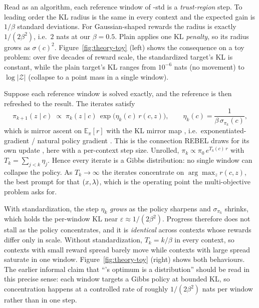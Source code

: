 Read as an algorithm, each reference window of \rrebel{}-std is a
\emph{trust-region} step. To leading order the KL radius is the same in every
context and the expected gain is $1/\beta$ standard deviations. For
Gaussian-shaped rewards the radius is exactly $1/(2\beta^2)$, i.e.\ $2$ nats at
our $\beta = 0.5$. Plain \rrebel{} applies one KL \emph{penalty}, so its radius
grows as $\sigma(c)^2$. Figure~\ref{fig:theory-toy} (left) shows the
consequence on a toy problem: over five decades of reward scale, the
standardized target's KL is constant, while the plain target's KL ranges from
$10^{-6}$ nats (no movement) to $\log|\mathcal{Z}|$ (collapse to a point mass
in a single window).

\begin{proposition}
\label{prop:mirror}
Suppose each reference window is solved exactly, and the reference is then
refreshed to the result. The iterates satisfy
\begin{equation}
  \pi_{k+1}(z\mid c) \;\propto\; \pi_k(z\mid c)\,
  \exp\bigl(\eta_k(c)\, r(c,z)\bigr),
  \qquad \eta_k(c) = \frac{1}{\beta\,\sigma_{\pi_k}(c)},
  \label{eq:th-mirror}
\end{equation}
which is mirror ascent on $\mathbb{E}_\pi[r]$ with the KL mirror map
\citep{beck2003mirror}, i.e.\ exponentiated-gradient / natural policy gradient
\citep{kakade2001npg}. This is the connection REBEL draws for its own update
\citep{gao2024rebel}, here with a per-context step size. Unrolled,
$\pi_k \propto \pi_0\, e^{T_k(c)\, r}$ with $T_k = \sum_{j<k}\eta_j$. Hence every
iterate is a Gibbs distribution: no single window can collapse the policy. As
$T_k \to \infty$ the iterates concentrate on $\arg\max_z r(c,z)$, the best
prompt for that $(x,\lambda)$, which is the operating point the multi-objective
problem asks for.
\end{proposition}

With standardization, the step $\eta_k$ \emph{grows} as the policy sharpens and
$\sigma_{\pi_k}$ shrinks, which holds the per-window KL near
$\varepsilon \approx 1/(2\beta^2)$. Progress therefore does not stall as the
policy concentrates, and it is \emph{identical} across contexts whose rewards
differ only in scale. Without standardization, $T_k = k/\beta$ in every
context, so contexts with small reward spread barely move while contexts with
large spread saturate in one window. Figure~\ref{fig:theory-toy} (right) shows
both behaviours. The earlier informal claim that ``\rrebel{}'s optimum is a
distribution'' should be read in this precise sense: each window targets a
Gibbs policy at bounded KL, so concentration happens at a controlled rate of
roughly $1/(2\beta^2)$ nats per window rather than in one step.

